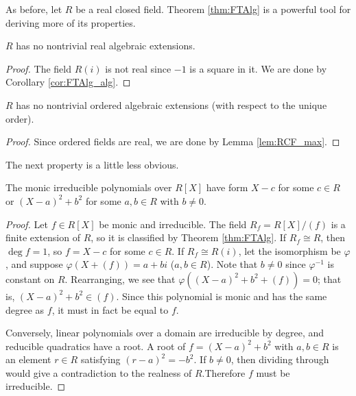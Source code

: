 As before, let $R$ be a real closed field. Theorem \ref{thm:FTAlg} is a powerful tool for deriving more of its properties.

\begin{lemma}
  \label{lem:RCF_max}
  \leanok
  $R$ has no nontrivial real algebraic extensions.
\end{lemma}
\begin{proof}
  \leanok
  The field $R(i)$ is not real since $-1$ is a square in it. We are done by Corollary \ref{cor:FTAlg_alg}.
\end{proof}

\begin{corollary}
  \label{lem:RCF_max_ord}
  \leanok
  $R$ has no nontrivial ordered algebraic extensions (with respect to the unique order).
\end{corollary}
\begin{proof}
  \leanok
  Since ordered fields are real, we are done by Lemma \ref{lem:RCF_max}.
\end{proof}

The next property is a little less obvious.

\begin{lemma}
  \label{lem:irreds_class}
  \leanok
  The monic irreducible polynomials over $R[X]$ have form $X-c$ for some $c\in R$ or $(X-a)^2+b^2$ for some $a,b\in R$ with $b\neq0$.
\end{lemma}
\begin{proof}
  \leanok
  Let $f\in R[X]$ be monic and irreducible. The field $R_f=R[X]/(f)$ is a finite extension of $R$, so it is classified by Theorem \ref{thm:FTAlg}. If $R_f\cong R$, then $\deg f=1$, so $f=X-c$ for some $c\in R$. If $R_f\cong R(i)$, let the isomorphism be $\varphi$, and suppose $\varphi(X+(f))=a+bi$ ($a,b\in R$). Note that $b\neq0$ since $\varphi^{-1}$ is constant on $R$. Rearranging, we see that $\varphi((X-a)^2+b^2+(f))=0$; that is, $(X-a)^2+b^2\in(f)$. Since this polynomial is monic and has the same degree as $f$, it must in fact be equal to $f$.

  Conversely, linear polynomials over a domain are irreducible by degree, and reducible quadratics have a root. A root of $f=(X-a)^2+b^2$ with $a,b\in R$ is an element $r\in R$ satisfying $(r-a)^2=-b^2$. If $b\neq0$, then dividing through would give a contradiction to the realness of $R$.Therefore $f$ must be irreducible.
\end{proof}

